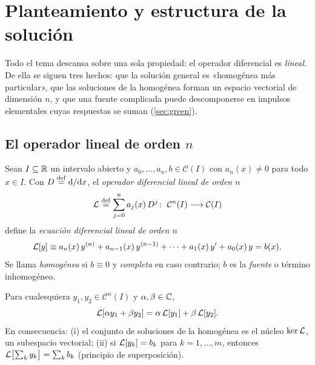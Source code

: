 \section{Planteamiento y estructura de la solución}\label{sec:estructura}

Todo el tema descansa sobre una sola propiedad: el operador diferencial es
\emph{lineal}. De ella se siguen tres hechos: que la solución general es
«homogénea más particular», que las soluciones de la homogénea forman un
espacio vectorial de dimensión $n$, y que una fuente complicada puede
descomponerse en impulsos elementales cuyas respuestas se suman
(\cref{sec:green}).

\subsection{El operador lineal de orden \texorpdfstring{$n$}{n}}\label{sec:operador}

\begin{definicion}\label{def:lineal}
Sean $I\subseteq\mathbb{R}$ un intervalo abierto y $a_0,\dots,a_n,b\in\mathcal C(I)$
con $a_n(x)\neq0$ para todo $x\in I$. Con $D\mathrel{\overset{\mathrm{def}}{=}}\mathrm{d}/\mathrm{d} x$, el
\emph{operador diferencial lineal de orden $n$}
\begin{equation}\label{eq:operador}
  \mathcal{L}\mathrel{\overset{\mathrm{def}}{=}}\sum_{j=0}^{n}a_j(x)\,D^{j}\colon\ \mathcal C^{n}(I)\longrightarrow\mathcal C(I)
\end{equation}
define la \emph{ecuación diferencial lineal de orden $n$}
\begin{equation}\label{eq:edo}
  \mathcal{L}[y]\equiv a_n(x)\,y^{(n)}+a_{n-1}(x)\,y^{(n-1)}+\dots+a_1(x)\,y'+a_0(x)\,y=b(x).
\end{equation}
Se llama \emph{homogénea} si $b\equiv0$ y \emph{completa} en caso
contrario; $b$ es la \emph{fuente} o término inhomogéneo.
\end{definicion}

\begin{proposicion}\label{prop:linealidad}
Para cualesquiera $y_1,y_2\in\mathcal C^{n}(I)$ y $\alpha,\beta\in\mathbb{C}$,
\[
  \mathcal{L}[\alpha y_1+\beta y_2]=\alpha\,\mathcal{L}[y_1]+\beta\,\mathcal{L}[y_2].
\]
En consecuencia: \textup{(i)} el conjunto de soluciones de la homogénea es
el núcleo $\operatorname{ker}\mathcal{L}$, un subespacio vectorial; \textup{(ii)} si
$\mathcal{L}[y_k]=b_k$ para $k=1,\dots,m$, entonces
$\mathcal{L}\bigl[\sum_k y_k\bigr]=\sum_k b_k$ (principio de superposición).
\end{proposicion}

